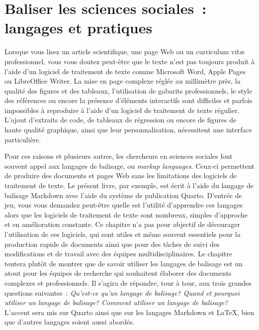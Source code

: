 \documentclass[
  letterpaper,
]{scrbook}
\begin{document}

\hypertarget{sec-chap7}{%
\chapter{Baliser les sciences sociales~: langages et
pratiques}\label{sec-chap7}}

Lorsque vous lisez un article scientifique, une page Web ou un
curriculum vitæ professionnel, vous vous doutez peut-être que le texte
n'est pas toujours produit à l'aide d'un logiciel de traitement de texte
comme Microsoft Word, Apple Pages ou LibreOffice Writer. La mise en page
complexe réglée au millimètre près, la qualité des figures et des
tableaux, l'utilisation de gabarits professionnels, le style des
références ou encore la présence d'éléments interactifs sont difficiles
et parfois impossibles à reproduire à l'aide d'un logiciel de traitement
de texte régulier. L'ajout d'extraits de code, de tableaux de régression
ou encore de figures de haute qualité graphique, ainsi que leur
personnalisation, nécessitent une interface particulière.

Pour ces raisons et plusieurs autres, les chercheurs en sciences
sociales font souvent appel aux langages de balisage, ou \emph{markup
languages}. Ceux-ci permettent de produire des documents et pages Web
sans les limitations des logiciels de traitement de texte. Le présent
livre, par exemple, est écrit à l'aide du langage de balisage Markdown
avec l'aide du système de publication Quarto. D'entrée de jeu, vous vous
demandez peut-être quelle est l'utilité d'apprendre ces langages alors
que les logiciels de traitement de texte sont nombreux, simples
d'approche et en amélioration constante. Ce chapitre n'a pas pour
objectif de décourager l'utilisation de ces logiciels, qui sont utiles
et même souvent essentiels pour la production rapide de documents ainsi
que pour des tâches de suivi des modifications et de travail avec des
équipes multidisciplinaires. Le chapitre tentera plutôt de montrer que
de savoir utiliser les langages de balisage est un atout pour les
équipes de recherche qui souhaitent élaborer des documents complexes et
professionnels. Il s'agira de répondre, tour à tour, aux trois grandes
questions suivantes~: \emph{Qu'est-ce qu'un langage de balisage? Quand
et pourquoi utiliser un langage de balisage? Comment utiliser un langage
de balisage?} L'accent sera mis sur Quarto ainsi que sur les langages
Markdown et \LaTeX, bien que d'autres langages soient aussi abordés.
\end{document}
